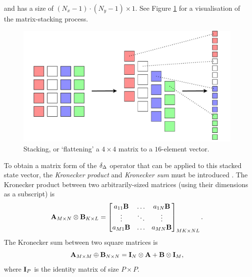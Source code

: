 and has a size of $(N_x-1)\cdot (N_y-1) \times 1$. See Figure \ref{fig:stackingMatrix} for a visualisation of the matrix-stacking process.
\begin{figure}[t]
    \centering
    \includegraphics[width=\textwidth]{figures/resonators/2d/stackingMatrix.pdf}
    \caption{Stacking, or `flattening' a $4\times 4$ matrix to a $16$-element vector. \label{fig:stackingMatrix}}
\end{figure}

To obtain a matrix form of the $\delta_{\Delta}$ operator that can be applied to this stacked state vector, the \textit{Kronecker product} and \textit{Kronecker sum} must be introduced \cite{Horn1991}. The Kronecker product between two arbitrarily-sized matrices (using their dimensions as a subscript) is
\begin{equation}
    \mathbf{A}_{M\times N} \otimes \mathbf{B}_{K\times L} = \begin{bmatrix}
        a_{11}\mathbf{B} & \hdots & a_{1N}\mathbf{B}\\
        \vdots & \ddots & \vdots\\
        a_{M1}\mathbf{B} & \hdots & a_{MN}\mathbf{B}\\
    \end{bmatrix}_{MK \times NL}.
\end{equation}
The Kronecker sum between two square matrices is 
\begin{equation}
    \mathbf{A}_{M \times M} \oplus \mathbf{B}_{N \times N} = \mathbf{I}_N\otimes \mathbf{A} + \mathbf{B} \otimes\mathbf{I}_M,
\end{equation}
where $\mathbf{I}_P$ is the identity matrix of size $P\times P$. 

